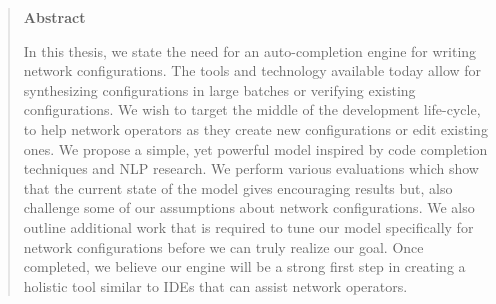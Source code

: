 \begin{quote}
\begin{center}{\bf \large Abstract}\end{center}
In this thesis, we state the need for an auto-completion engine for writing network configurations. The tools and technology available today allow for synthesizing configurations in large batches or verifying existing configurations. We wish to target the middle of the development life-cycle, to help network operators as they create new configurations or edit existing ones. We propose a simple, yet powerful model inspired by code completion techniques and NLP research. We perform various evaluations which show that the current state of the model gives encouraging results but, also challenge some of our assumptions about network configurations. We also outline additional work that is required to tune our model specifically for network configurations before we can truly realize our goal. Once completed, we believe our engine will be a strong first step in creating a holistic tool similar to IDEs that can assist network operators. 
\end{quote}
